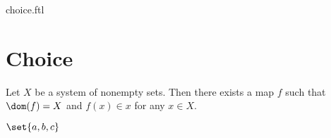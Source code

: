 \documentclass{naproche-library}
\begin{document}
\begin{smodule}{choice.ftl}

  \section{Choice}

  \begin{axiom}[forthel,title=Axiom of Choice,id=FOUNDATIONS_10_1897613305577472]
    Let $X$ be a system of nonempty sets.
    Then there exists a map $f$ such that $\dom(f) = X$ and $f(x) \in x$ for any $x \in X$.
  \end{axiom}

  $\set{a,b,c}$
\end{smodule}
\end{document}
